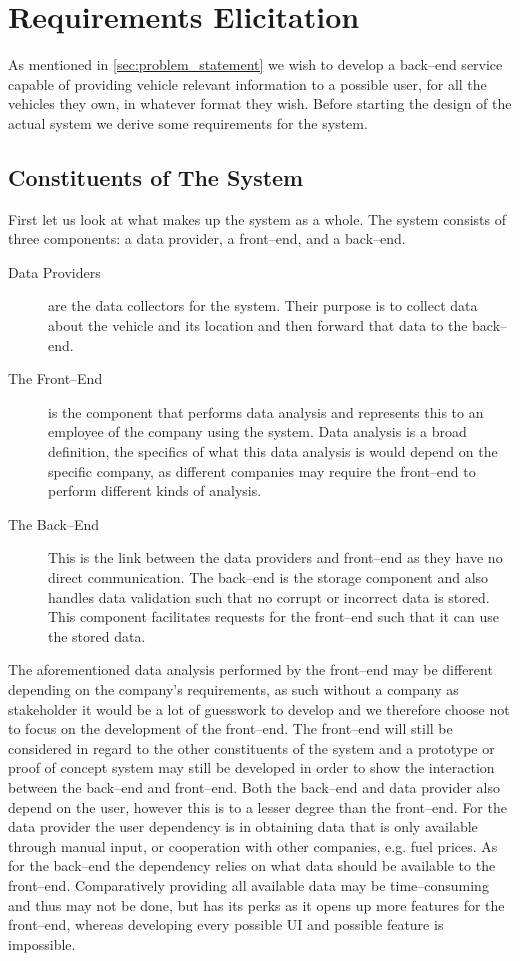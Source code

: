 \chapter{Requirements Elicitation}\label{cha:requirements_elicitation}
As mentioned in \cref{sec:problem_statement} we wish to develop a back--end service capable of providing vehicle relevant information to a possible user, for all the vehicles they own, in whatever format they wish.
Before starting the design of the actual system we derive some requirements for the system.

\section{Constituents of The System}\label{sec:constituents_of_the_system}
First let us look at what makes up the system as a whole.
The system consists of three components: a data provider, a front--end, and a back--end.
\begin{description}
    \item [Data Providers] are the data collectors for the system. Their purpose is to collect data about the vehicle and its location and then forward that data to the back--end.
    \item [The Front--End] is the component that performs data analysis and represents this to an employee of the company using the system.
    Data analysis is a broad definition, the specifics of what this data analysis is would depend on the specific company, as different companies may require the front--end to perform different kinds of analysis.
    \item [The Back--End] This is the link between the data providers and front--end as they have no direct communication.
    The back--end is the storage component and also handles data validation such that no corrupt or incorrect data is stored.
    This component facilitates requests for the front--end such that it can use the stored data.
\end{description}

The aforementioned data analysis performed by the front--end may be different depending on the company's requirements, as such without a company as stakeholder it would be a lot of guesswork to develop and we therefore choose not to focus on the development of the front--end.
The front--end will still be considered in regard to the other constituents of the system and a prototype or proof of concept system may still be developed in order to show the interaction between the back--end and front--end.
Both the back--end and data provider also depend on the user, however this is to a lesser degree than the front--end.
For the data provider the user dependency is in obtaining data that is only available through manual input, or cooperation with other companies, e.g. fuel prices.
As for the back--end the dependency relies on what data should be available to the front--end.
Comparatively providing all available data may be time--consuming and thus may not be done, but has its perks as it opens up more features for the front--end, whereas developing every possible UI and possible feature is impossible.

